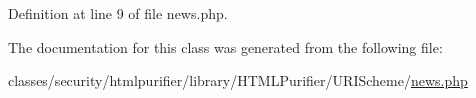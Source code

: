 Definition at line 9 of file news.\+php.



The documentation for this class was generated from the following file\+:\begin{DoxyCompactItemize}
\item 
classes/security/htmlpurifier/library/\+H\+T\+M\+L\+Purifier/\+U\+R\+I\+Scheme/\hyperlink{news_8php}{news.\+php}\end{DoxyCompactItemize}
